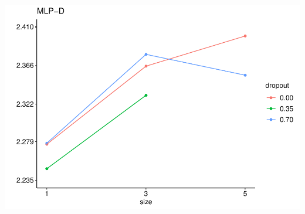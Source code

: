 \documentclass[
]{article}
\begin{document}
\includegraphics{sl-inf-cairs-2301_files/figure-latex/optResults-6.pdf}
\end{document}
